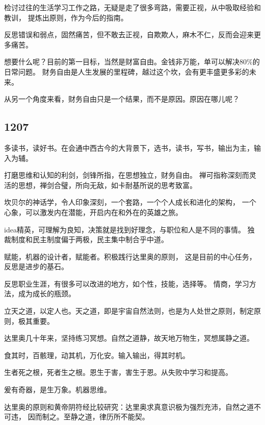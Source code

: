 检讨过往的生活学习工作之路，无疑是走了很多弯路，需要正视，从中吸取经验和教训，
提炼出原则，作为今后的指南。

反思错误和弱点，固然痛苦，但不敢去正视，自欺欺人，麻木不仁，反而会迎来更多痛苦。

想要什么呢？目前的第一目标，当然是财富自由。金钱非万能，单可以解决80\%的日常问题。
财务自由是人生发展的里程碑，越过这个坎，会有更丰盛更多彩的未来。

从另一个角度来看，财务自由只是一个结果，而不是原因。原因在哪儿呢？

\subsection{1207}

多读书，读好书。在会通中西古今的大背景下，选书，读书，写书，输出为主，输入为辅。

打磨思维和认知的利剑，剑锋所指，在思想独立，财务自由。
禅可指称深刻而灵活的思想，禅剑合璧，所向无敌，如卡耐基所说的思考致富。

坎贝尔的神话学，令人印象深刻，一个套路，一个个人成长和进化的架构，
一个心象，可以激发内在潜能，开启内在和外在的英雄之旅。

idea精英，可理解为良知，决策就是找到好理念，与职位和人是不同的事情。
独裁制度和民主制度偏于两极，民主集中制合乎中道。

赋能，机器的设计者，赋能者。积极践行达里奥的原则，
这是目前的中心任务，反思是进步的基石。

反思职业生涯，有很多可以改进的地方，如个性，技能，选择等。
情商，学习方法，成为成长的瓶颈。

立天之道，以定人也。天之道，即是宇宙自然法则，也是为人处世之原则，制定原则，极其重要。

达里奥几十年来，坚持练习冥想。自然之道静，故天地万物生，冥想属静之道。

食其时，百骸理，动其机，万化安。输入输出，得其时机。

生者死之根，死者生之根。恩生于害，害生于恩。从失败中学习和提高。

爰有奇器，是生万象。机器思维。

达里奥的原则和黄帝阴符经比较研究：达里奥求真意识极为强烈充沛，自然之道不可违，
因而制之。至静之道，律历所不能契。
